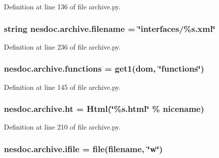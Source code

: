 Definition at line 136 of file archive.\+py.

\subsubsection[{\texorpdfstring{filename}{filename}}]{\setlength{\rightskip}{0pt plus 5cm}string nesdoc.\+archive.\+filename = \char`\"{}interfaces/\%s.\+xml\char`\"{}}\hypertarget{namespacenesdoc_1_1archive_a3bd3639fb04d21af62d464e2ace3d6d5}{}\label{namespacenesdoc_1_1archive_a3bd3639fb04d21af62d464e2ace3d6d5}


Definition at line 236 of file archive.\+py.

\subsubsection[{\texorpdfstring{functions}{functions}}]{\setlength{\rightskip}{0pt plus 5cm}nesdoc.\+archive.\+functions = {\bf get1}({\bf dom}, \char`\"{}functions\char`\"{})}\hypertarget{namespacenesdoc_1_1archive_af12b4f9e9b4aa2c2b977e63ebe8f8b93}{}\label{namespacenesdoc_1_1archive_af12b4f9e9b4aa2c2b977e63ebe8f8b93}


Definition at line 145 of file archive.\+py.

\subsubsection[{\texorpdfstring{ht}{ht}}]{\setlength{\rightskip}{0pt plus 5cm}nesdoc.\+archive.\+ht = {\bf Html}(\char`\"{}\%s.\+html\char`\"{} \% nicename)}\hypertarget{namespacenesdoc_1_1archive_aa1b54f5d388a3d329d1e56d9ff2b8194}{}\label{namespacenesdoc_1_1archive_aa1b54f5d388a3d329d1e56d9ff2b8194}


Definition at line 210 of file archive.\+py.

\subsubsection[{\texorpdfstring{ifile}{ifile}}]{\setlength{\rightskip}{0pt plus 5cm}nesdoc.\+archive.\+ifile = file({\bf filename}, \char`\"{}w\char`\"{})}\hypertarget{namespacenesdoc_1_1archive_a82e3fa6d86d02e9d5f524f2508bb358f}{}\label{namespacenesdoc_1_1archive_a82e3fa6d86d02e9d5f524f2508bb358f}


